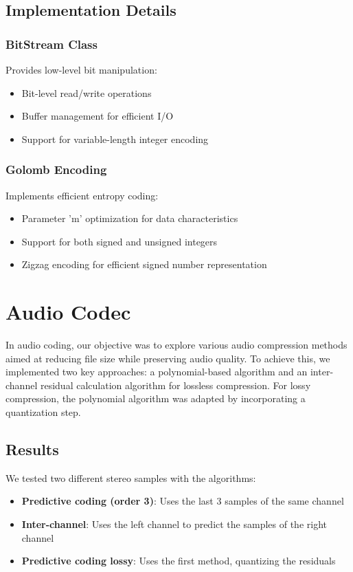 \documentclass[a4paper,14pt]{article}
\begin{document}
\subsection{Implementation Details}

\subsubsection{BitStream Class}
Provides low-level bit manipulation:
\begin{itemize}
    \item Bit-level read/write operations
    \item Buffer management for efficient I/O
    \item Support for variable-length integer encoding
\end{itemize}

\subsubsection{Golomb Encoding}
Implements efficient entropy coding:
\begin{itemize}
    \item Parameter 'm' optimization for data characteristics
    \item Support for both signed and unsigned integers
    \item Zigzag encoding for efficient signed number representation
\end{itemize}

\section{Audio Codec}
In audio coding, our objective was to explore various audio compression methods aimed at reducing file size while preserving audio quality. To achieve this, we implemented two key approaches: a polynomial-based algorithm and an inter-channel residual calculation algorithm for lossless compression. For lossy compression, the polynomial algorithm was adapted by incorporating a quantization step.

\subsection{Results}
We tested two different stereo samples with the algorithms:
\begin{itemize}
    \item \textbf{Predictive coding (order 3)}: Uses the last 3 samples of the same channel
    \item \textbf{Inter-channel}: Uses the left channel to predict the samples of the right channel
    \item \textbf{Predictive coding lossy}: Uses the first method, quantizing the residuals    
\end{itemize}
\end{document}
